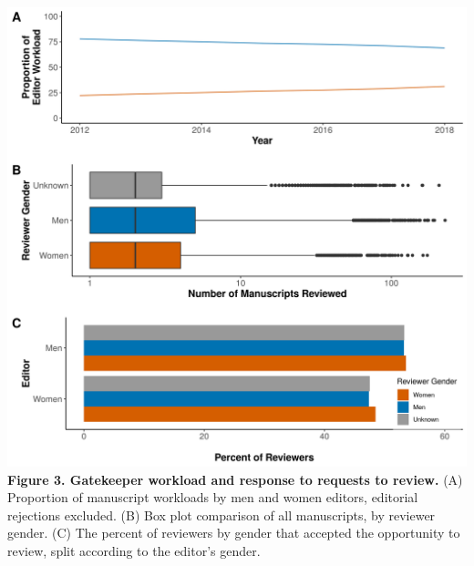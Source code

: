 \documentclass[11pt,]{article}
\begin{document}
\newpage

\includegraphics{Figure_2.png} \textbf{Figure 3. Gatekeeper workload and
response to requests to review.} (A) Proportion of manuscript workloads
by men and women editors, editorial rejections excluded. (B) Box plot
comparison of all manuscripts, by reviewer gender. (C) The percent of
reviewers by gender that accepted the opportunity to review, split
according to the editor's gender.

\newpage
\end{document}
